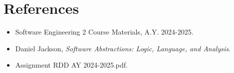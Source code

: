 \section{References}
\label{sec:references}%

\begin{itemize}
    \item Software Engineering 2 Course Materials, A.Y. 2024-2025.
    \item Daniel Jackson, \textit{Software Abstractions: Logic, Language, and Analysis}.
    \item Assignment RDD AY 2024-2025.pdf.
\end{itemize}
